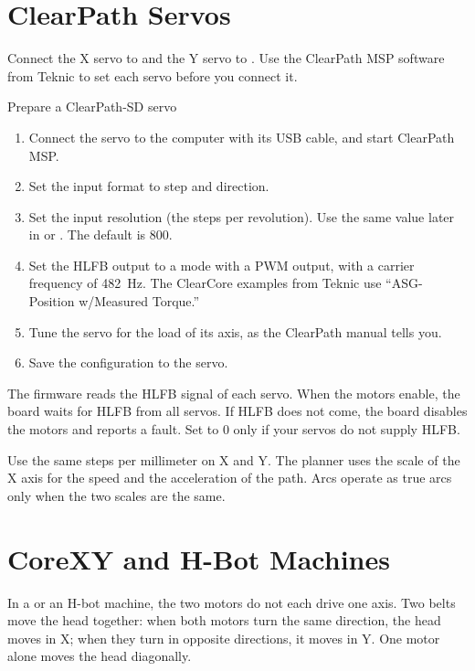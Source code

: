 \section{ClearPath Servos}

Connect the X servo to  and the Y servo to . Use the
ClearPath MSP software from Teknic to set each servo before you connect it.

\begin{procedure}{Prepare a ClearPath-SD servo}
\begin{enumerate}
  \item Connect the servo to the computer with its USB cable, and start
        ClearPath MSP.
  \item Set the input format to step and direction.
  \item Set the input resolution (the steps per revolution). Use the same
        value later in  or . The default is 800.
  \item Set the HLFB output to a mode with a PWM output, with a carrier
        frequency of 482~Hz. The ClearCore examples from Teknic use
        ``ASG-Position w/Measured Torque.''
  \item Tune the servo for the load of its axis, as the ClearPath manual
        tells you.
  \item Save the configuration to the servo.
\end{enumerate}
\end{procedure}

The firmware reads the HLFB signal of each servo. When the motors enable,
the board waits for HLFB from all servos. If HLFB does not come, the board
disables the motors and reports a fault. Set  to 0 only if
your servos do not supply HLFB.

\begin{note}
\notelabel Use the same steps per millimeter on X and Y. The planner uses the
scale of the X axis for the speed and the acceleration of the path. Arcs
operate as true arcs only when the two scales are the same.
\end{note}

\section{CoreXY and H-Bot Machines}\label{sec:corexy}

In a  or an H-bot machine, the two motors do not each drive one
axis. Two belts move the head together: when both motors turn the same
direction, the head moves in X; when they turn in opposite directions, it
moves in Y. One motor alone moves the head diagonally.

